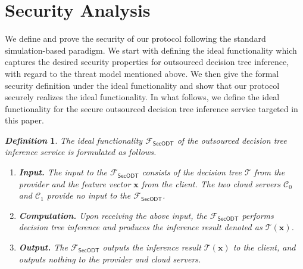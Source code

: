 \documentclass[10pt,journal,compsoc]{IEEEtran}
\newtheorem{definition}{\textbf{\emph{Definition}}}
\begin{document}
\section{Security Analysis}
\label{sec:security-analysis}


We define and prove the security of our protocol following the standard simulation-based paradigm. 
%
We start with defining the ideal functionality which captures the desired security properties for outsourced decision tree inference, with regard to the threat model mentioned above.
%
We then give the formal security definition under the ideal functionality and show that our protocol securely realizes the ideal functionality.
%
In what follows, we define the ideal functionality for the secure outsourced decision tree inference service targeted in this paper.

\begin{definition}
%
The ideal functionality $\mathcal{F}_{\mathsf{SecODT}}$ of the outsourced decision tree inference service is formulated as follows.

\begin{enumerate}[-]

\item \textbf{Input.} The input to the $\mathcal{F}_{\mathsf{SecODT}}$ consists of the decision tree $\mathcal{T}$ from the provider and the feature vector $\mathbf{x}$ from the client. The two cloud servers $\mathcal{C}_0$ and $\mathcal{C}_1$ provide no input to the $\mathcal{F}_{\mathsf{SecODT}}$.

\item \textbf{Computation.} Upon receiving the above input, the $\mathcal{F}_{\mathsf{SecODT}}$ performs decision tree inference and produces the inference result denoted as $\mathcal{T}(\mathbf{x})$.

\item \textbf{Output.} The $\mathcal{F}_{\mathsf{SecODT}}$ outputs the inference result $\mathcal{T}(\mathbf{x})$ to the client, and outputs nothing to the provider and cloud servers.
\end{enumerate}

\end{definition}
\end{document}

